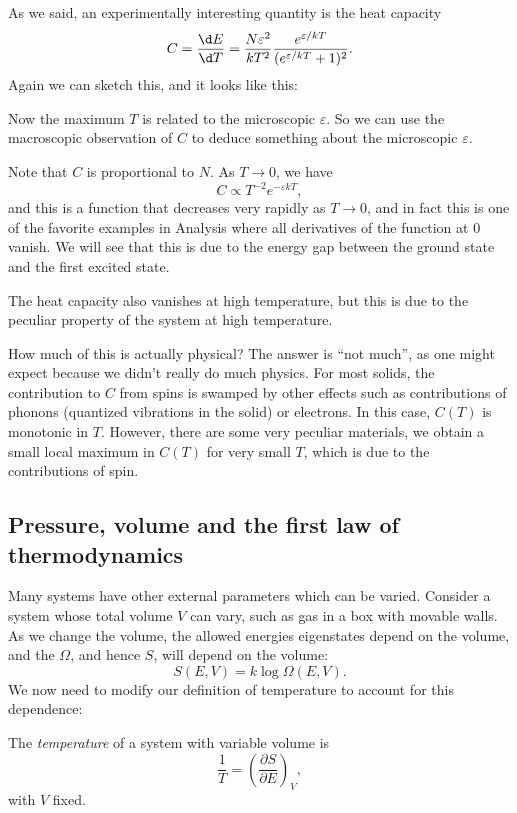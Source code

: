 \documentclass[a4paper]{article}
\begin{document}
\begin{eg}
  As we said, an experimentally interesting quantity is the heat capacity
  \[
    C = \frac{\d E}{\d T} = \frac{N\varepsilon^2}{ kT^2 } \frac{e^{\varepsilon/kT}}{(e^{\varepsilon/kT} + 1)^2}.
  \]
  Again we can sketch this, and it looks like this:
  \begin{center}
  \end{center}
  Now the maximum $T$ is related to the microscopic $\varepsilon$. So we can use the macroscopic observation of $C$ to deduce something about the microscopic $\varepsilon$.

  Note that $C$ is proportional to $N$. As $T \to 0$, we have
  \[
    C \propto T^{-2} e^{-\varepsilon kT},
  \]
  and this is a function that decreases very rapidly as $T \to 0$, and in fact this is one of the favorite examples in Analysis where all derivatives of the function at $0$ vanish. We will see that this is due to the energy gap between the ground state and the first excited state.

  The heat capacity also vanishes at high temperature, but this is due to the peculiar property of the system at high temperature.
\end{eg}

How much of this is actually physical? The answer is ``not much'', as one might expect because we didn't really do much physics. For most solids, the contribution to $C$ from spins is swamped by other effects such as contributions of phonons (quantized vibrations in the solid) or electrons. In this case, $C(T)$ is monotonic in $T$. However, there are some very peculiar materials, we obtain a small local maximum in $C(T)$ for very small $T$, which is due to the contributions of spin. %

\subsection{Pressure, volume and the first law of thermodynamics}
Many systems have other external parameters which can be varied. Consider a system whose total volume $V$ can vary, such as gas in a box with movable walls. As we change the volume, the allowed energies eigenstates depend on the volume, and the $\Omega$, and hence $S$, will depend on the volume:
\[
  S(E, V) = k \log \Omega(E, V).
\]
We now need to modify our definition of temperature to account for this dependence:
\begin{defi}[Temperature]
  The \emph{temperature} of a system with variable volume is
  \[
    \frac{1}{T} = \left(\frac{\partial S}{\partial E}\right)_V,
  \]
  with $V$ fixed.
\end{defi}
\end{document}
